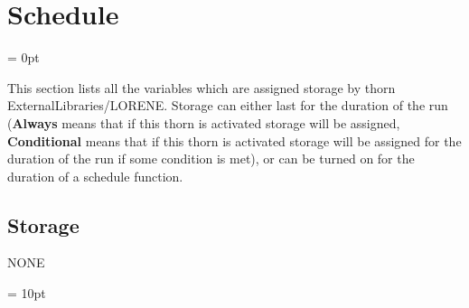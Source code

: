 
\section{Schedule} 


\parskip = 0pt


\noindent This section lists all the variables which are assigned storage by thorn ExternalLibraries/LORENE.  Storage can either last for the duration of the run ({\bf Always} means that if this thorn is activated storage will be assigned, {\bf Conditional} means that if this thorn is activated storage will be assigned for the duration of the run if some condition is met), or can be turned on for the duration of a schedule function.


\subsection*{Storage}NONE

\vspace{5mm}\parskip = 10pt 
